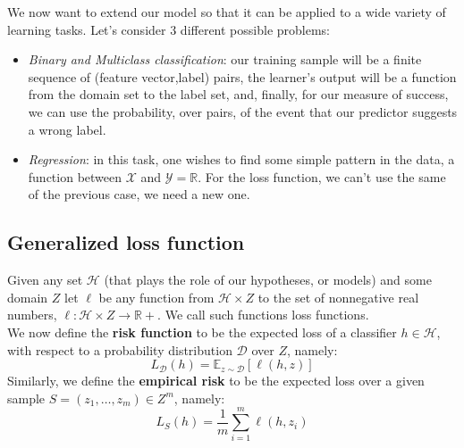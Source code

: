 \documentclass[12pt]{report}
\theoremstyle{plain}
\newcommand\mcl[1]{\mathcal{#1}}
\begin{document}
\begin{flushleft}
\vspace{0.5cm}
We now want to extend our model so that it can be applied to a wide variety of learning tasks. Let's consider 3 different possible problems:
\begin{itemize}
\item \textit{Binary and Multiclass classification}: our training sample will be a finite sequence of (feature vector,label) pairs, the learner’s output will be a function from the domain set to the label set, and, finally, for our measure of success, we can use the probability, over pairs, of the event that our predictor suggests a wrong label.
\item \textit{Regression}: in this task, one wishes to find some simple pattern in the data, a function between $\mcl{X}$ and $\mcl{Y}=\mathds{R}$. For the loss function, we can't use the same of the previous case, we need a new one.
\end{itemize}

\subsection{Generalized loss function}
Given any set $\mcl{H}$ (that plays the role of our hypotheses, or models) and some domain $Z$ let $\ell$ be any function from $\mcl{H}\times Z$ to the set of nonnegative real numbers, $\ell:\mcl{H}\times Z\to\mathds{R}+$. We call such functions loss functions.\\
We now define the \textbf{risk function} to be the expected loss of a classifier $h\in\mcl{H}$, with respect to a probability distribution $\mcl{D}$ over $Z$, namely:
\begin{equation}
L_\mcl{D}(h) = \mathds{E}_{z\sim\mcl{D}}\left[\ell(h,z)\right]
\label{eq:risk_func}
\end{equation}
Similarly, we define the \textbf{empirical risk} to be the expected loss over a given sample $S=(z_1,\dots,z_m)\in Z^m$, namely:
\begin{equation}
L_S(h) = \frac{1}{m}\sum_{i=1}^m\ell(h,z_i)
\label{eq:emp_risk}
\end{equation}


\end{flushleft}
\end{document}
